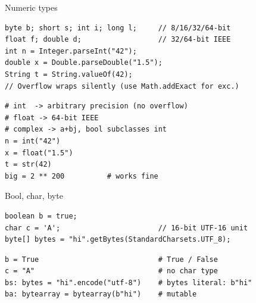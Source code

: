 \documentclass[10pt]{article}
\begin{document}
\begin{construct}{Numeric types}
\noindent
\begin{minipage}[t]{0.485\linewidth}
\begin{lstlisting}[style=java, title=Java]
byte b; short s; int i; long l;     // 8/16/32/64-bit
float f; double d;                  // 32/64-bit IEEE
int n = Integer.parseInt("42");
double x = Double.parseDouble("1.5");
String t = String.valueOf(42);
// Overflow wraps silently (use Math.addExact for exc.)
\end{lstlisting}
\end{minipage}\hfill
\begin{minipage}[t]{0.485\linewidth}
\begin{lstlisting}[style=python, title=Python]
# int  -> arbitrary precision (no overflow)
# float -> 64-bit IEEE
# complex -> a+bj, bool subclasses int
n = int("42")
x = float("1.5")
t = str(42)
big = 2 ** 200          # works fine
\end{lstlisting}
\end{minipage}
\end{construct}

\begin{construct}{Bool, char, byte}
\noindent
\begin{minipage}[t]{0.485\linewidth}
\begin{lstlisting}[style=java, title=Java]
boolean b = true;
char c = 'A';                       // 16-bit UTF-16 unit
byte[] bytes = "hi".getBytes(StandardCharsets.UTF_8);
\end{lstlisting}
\end{minipage}\hfill
\begin{minipage}[t]{0.485\linewidth}
\begin{lstlisting}[style=python, title=Python]
b = True                            # True / False
c = "A"                             # no char type
bs: bytes = "hi".encode("utf-8")    # bytes literal: b"hi"
ba: bytearray = bytearray(b"hi")    # mutable
\end{lstlisting}
\end{minipage}
\end{construct}

\end{document}
